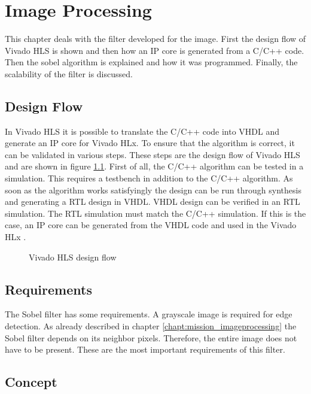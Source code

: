 \chapter{Image Processing}  \label{chapt:ip}
This chapter deals with the filter developed for the image. First the design flow of Vivado HLS is shown and then how an IP core is generated from a C/C++ code. Then the sobel algorithm is explained and how it was programmed. Finally, the scalability of the filter is discussed. 

\section{Design Flow}
In Vivado HLS it is possible to translate the C/C++ code into VHDL and generate an IP core for Vivado HLx. To ensure that the algorithm is correct, it can be validated in various steps. These steps are the design flow of Vivado HLS and are shown in figure \ref{fig:hls_design_flow}.
First of all, the C/C++ algorithm can be tested in a simulation. This requires a testbench in addition to the C/C++ algorithm. As soon as the algorithm works satisfyingly the design can be run through synthesis and generating a RTL design in VHDL. VHDL design can be verified in an RTL simulation. The RTL simulation must match the C/C++ simulation. If this is the case, an IP core can be generated from the VHDL code and used in the Vivado HLx \cite{vivado_hls}.

\begin{figure}[tb!]
    \centering
    
    \caption{Vivado HLS design flow}
    \label{fig:hls_design_flow}
\end{figure}


\section{Requirements}

The Sobel filter has some requirements. A grayscale image is required for edge detection. As already described in chapter \ref{chapt:mission_imageprocessing} the Sobel filter depends on its neighbor pixels. Therefore, the entire image does not have to be present. These are the most important requirements of this filter.


\section{Concept} \label{chapt:concept}

